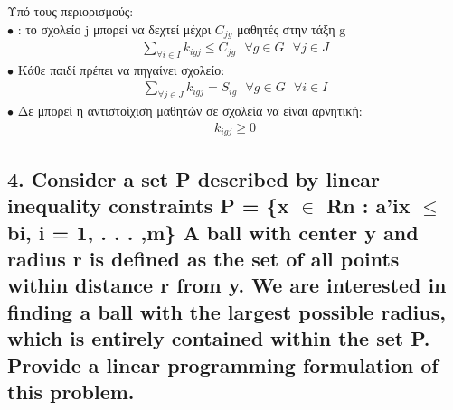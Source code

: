 \documentclass[12pt]{article}
\newcommand{\centered}[1]{\begin{align*}#1\end{align*}}
\begin{document}
Υπό τους περιορισμούς: \\
\( \bullet \) : το σχολείο j μπορεί να δεχτεί μέχρι \( C_{jg} \) μαθητές στην τάξη g  \\
\centered{ \sum_{\forall i \in I}{ k_{igj} \leq C_{jg} } \mbox{ } \forall g \in G \mbox{ } \forall j \in J  }
\( \bullet \) Κάθε παιδί πρέπει να πηγαίνει σχολείο: \\
\centered{ \sum_{\forall j \in J}{ k_{igj} = S_{ig} } \mbox{ } \forall g \in G \mbox{ } \forall i \in I  }
\( \bullet \) Δε μπορεί η αντιστοίχιση μαθητών σε σχολεία να είναι αρνητική: \\
\centered{ k_{igj} \geq 0 }

\vspace{2in}

\pagebreak

\subsection*{4. Consider a set P described by linear inequality constraints
P = \{x \ensuremath{\in} Rn : a'ix \ensuremath{\leq} bi, i = 1, . . . ,m\}
A ball with center y and radius r is defined as the set of all points within distance r from y.
We are interested in finding a ball with the largest possible radius, which is entirely contained
within the set P. Provide a linear programming formulation of this problem.}

\vspace{2in}

\pagebreak
\end{document}
